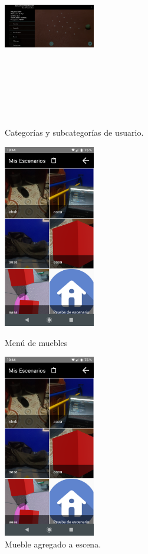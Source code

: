 \begin{figure}[h!]
	\begin{minipage}{0.32\textwidth}
		\centering
		\includegraphics[width=4cm,height=8cm]{imagenes/desarrollo/app/categories.jpg}
		\caption{Categorías y subcategorías de usuario.}
		\label{fig:appmenucat}
	\end{minipage}\hfill
	\begin{minipage}{0.32\textwidth}
		\centering
		\includegraphics[width=4cm,height=8cm]{imagenes/desarrollo/app/scenarios.png}
		\caption{Menú de muebles}
		\label{fig:appmenu}
	\end{minipage}\hfill
	\begin{minipage}{0.32\textwidth}
		\centering
		\includegraphics[width=4cm,height=8cm]{imagenes/desarrollo/app/scenarios.png}
		\caption{Mueble agregado a escena.}
		\label{fig:appfurn}
	\end{minipage}\hfill
\end{figure}


